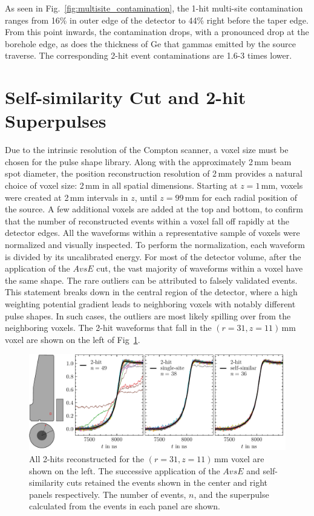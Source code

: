 As seen in Fig.~\ref{fig:multisite_contamination}, the 1-hit multi-site contamination ranges from 16\% in outer edge of the detector to 44\% right before the taper edge. From this point inwards, the contamination drops, with a pronounced drop at the borehole edge, as does the thickness of Ge that gammas emitted by the \CsS{} source traverse. The corresponding 2-hit event contaminations are 1.6-3 times lower. 

\section{Self-similarity Cut and 2-hit Superpulses}

Due to the intrinsic resolution of the Compton scanner, a voxel size must be chosen for the pulse shape library. Along with the approximately 2\,mm \CsS{} beam spot diameter, the position reconstruction resolution of 2\,mm provides a natural choice of voxel size: 2\,mm in all spatial dimensions. Starting at $z = 1$\,mm, voxels were created at 2\,mm intervals in $z$, until $z = 99$\,mm for each radial position of the \CsS{} source. A few additional voxels are added at the top and bottom, to confirm that the number of reconstructed events within a voxel fall off rapidly at the detector edges. All the waveforms within a representative sample of voxels were normalized and visually inspected. To perform the normalization, each waveform is divided by its uncalibrated energy. For most of the detector volume, after the application of the $AvsE$ cut, the vast majority of waveforms within a voxel have the same shape. The rare outliers can be attributed to falsely validated events. This statement breaks down in the central region of the detector, where a high weighting potential gradient leads to neighboring voxels with notably different pulse shapes. In such cases, the outliers are most likely spilling over from the neighboring voxels. The 2-hit waveforms that fall in the $(r = 31, z = 11)$\,mm voxel are shown on the left of Fig~\ref{fig:Cs_superpulse_cuts}. 
\begin{figure}[htb]
    \centering
    \includegraphics[width=6in]{figs/pipeline/Cs_superpulse_cuts.pdf}
    \caption{All 2-hits reconstructed for the $(r = 31, z = 11)$\,mm voxel are shown on the left. The successive application of the $AvsE$ and self-similarity cuts retained the events shown in the center and right panels respectively. The number of events, $n$, and the superpulse calculated from the events in each panel are shown.}
    \label{fig:Cs_superpulse_cuts}
\end{figure}

